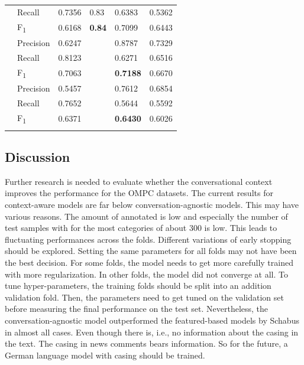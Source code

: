\begin{table}
\begin{tabular}{ l l l l l l}
& Recall & 0.7356 & 0.83 & 0.6383 & 0.5362 \\
& F\textsubscript{1} & 0.6168 & \textbf{0.84} & 0.7099 & 0.6443 \\ \addlinespace[2ex]
\multirow{3}{*}{Personal} & Precision & 0.6247 & & 0.8787 & 0.7329 \\
& Recall & 0.8123 & & 0.6271 & 0.6516 \\
& F\textsubscript{1} & 0.7063 & & \textbf{0.7188} & 0.6670 \\ \addlinespace[2ex]
\multirow{3}{*}{Argument} & Precision & 0.5457 & & 0.7612 & 0.6854 \\
& Recall & 0.7652 & & 0.5644 & 0.5592 \\
& F\textsubscript{1} & 0.6371 & & \textbf{0.6430} & 0.6026 \\ \addlinespace[2ex]
\bottomrule
\end{tabular}
\label{tab:res3}
\end{table}

\subsection{Discussion}

Further research is needed to evaluate whether the conversational context improves the performance for the OMPC datasets.
The current results for context-aware models are far below conversation-agnostic models.
This may have various reasons.
The amount of annotated is low and especially the number of test samples with for the most categories of about 300 is low.
This leads to fluctuating performances across the folds.
Different variations of early stopping should be explored.
Setting the same parameters for all folds may not have been the best decision.
For some folds, the model needs to get more carefully trained with more regularization.
In other folds, the model did not converge at all.
To tune hyper-parameters, the training folds should be split into an addition validation fold.
Then, the parameters need to get tuned on the validation set before measuring the final performance on the test set.
Nevertheless, the conversation-agnostic model outperformed the featured-based models by Schabus in almost all cases.
Even though there is, i.e., no information about the casing in the text.
The casing in news comments bears information.
So for the future, a German language model with casing should be trained.

